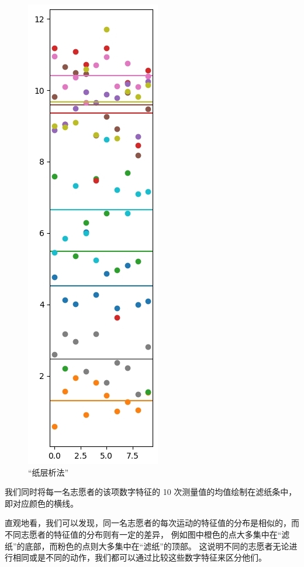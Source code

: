 \documentclass[withoutpreface]{cumcmthesis}
\begin{document}
\begin{figure}[!htbp]
\begin{minipage}[c]{0.48\textwidth}
        \includegraphics[height=0.3\textheight]{figures/1条滤纸.jpg}
    \end{minipage}
    \caption{“纸层析法”}
    \label{fig:滤纸条}
\end{figure}

我们同时将每一名志愿者的该项数字特征的 10 次测量值的均值绘制在滤纸条中，即对应颜色的横线。

直观地看，我们可以发现，同一名志愿者的每次运动的特征值的分布是相似的，而不同志愿者的特征值的分布则有一定的差异，
例如图中橙色的点大多集中在“滤纸”的底部，而粉色的点则大多集中在“滤纸”的顶部。
这说明不同的志愿者无论进行相同或是不同的动作，我们都可以通过比较这些数字特征来区分他们。
\end{document}
